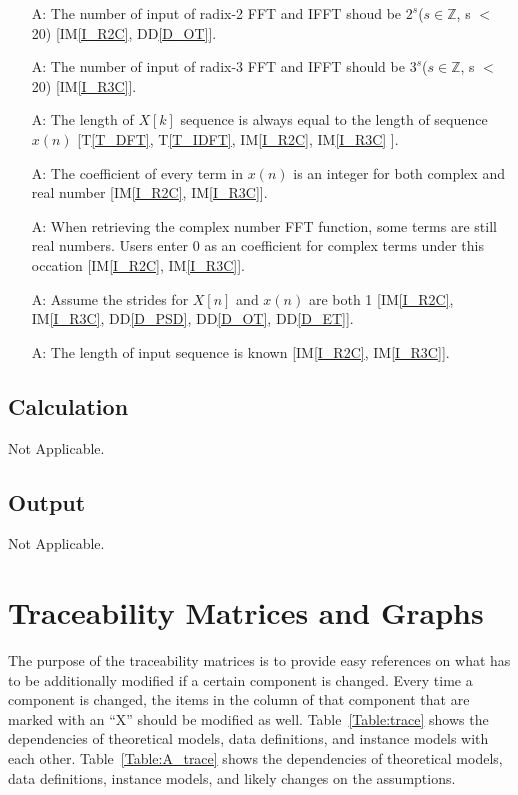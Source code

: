 \documentclass[12pt]{article}
\newcommand{\ddref}[1]{DD\ref{#1}}
\newcommand{\tref}[1]{T\ref{#1}}
\newcounter{assumpnum} %
\newcommand{\iref}[1]{IM\ref{#1}}
\begin{document}
\begin{itemize}

\item[A\refstepcounter{assumpnum}\theassumpnum \label{A_N2}:]
The number of  input of radix-2 FFT and IFFT shoud be $2^s$($s\in\mathbb{Z}$, s $<$ 20) [\iref{I_R2C}, \ddref{D_OT}].
\item[A\refstepcounter{assumpnum}\theassumpnum \label{A_N3}:]
The number of input of radix-3 FFT and IFFT should be $3^s$($s\in\mathbb{Z}$, s $<$ 20) [\iref{I_R3C}].
\item[A\refstepcounter{assumpnum}\theassumpnum \label{A_Equal}:]
The length of $X[k]$ sequence is always equal to the length of sequence $x(n)$  [\tref{T_DFT}, \tref{T_IDFT}, \iref{I_R2C}, \iref{I_R3C} ].
\item[A\refstepcounter{assumpnum}\theassumpnum \label{A_CoI}:]
The coefficient of every term in $x(n)$ is an integer for both complex and real number  [\iref{I_R2C}, \iref{I_R3C}].
\item[A\refstepcounter{assumpnum}\theassumpnum \label{A_C0}:]
When retrieving the complex number FFT function, some terms are still real numbers. Users enter 0 as an coefficient for complex terms under this occation [\iref{I_R2C}, \iref{I_R3C}].
\item[A\refstepcounter{assumpnum}\theassumpnum \label{A_Stride}:]
Assume the strides for ${X}[n]$ and ${x}(n)$ are both 1 [\iref{I_R2C}, \iref{I_R3C},  \ddref{D_PSD}, \ddref{D_OT}, \ddref{D_ET}].
\item[A\refstepcounter{assumpnum}\theassumpnum \label{A_Length}:]
The length of input sequence is known [\iref{I_R2C}, \iref{I_R3C}].


\end{itemize}

\subsection{Calculation} \label{sec_Calculation}
Not Applicable.
\subsection{Output} \label{sec_Output}    
Not Applicable.



\section{Traceability Matrices and Graphs}
The purpose of the traceability matrices is to provide easy references on what has to be additionally modified if a certain component is changed.  Every time a 
component is changed, the items in the column of that component that are 
marked with an ``X'' should be modified as well.  Table~\ref{Table:trace}
shows the dependencies of theoretical models, data
definitions, and instance models with each other.
 Table~\ref{Table:A_trace} shows the dependencies of theoretical models, data definitions,  instance models, and likely changes on the assumptions.
\end{document}
